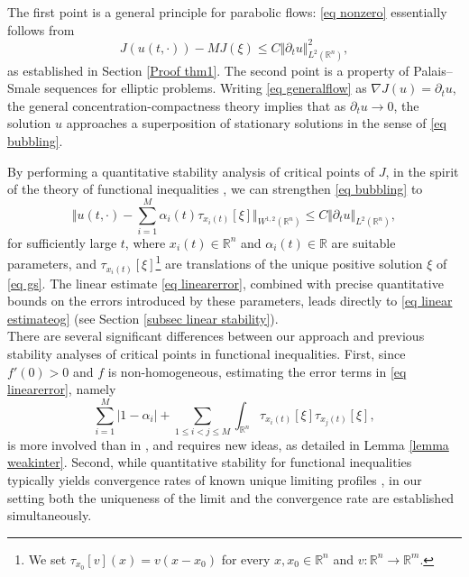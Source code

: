 \documentclass[11pt,letterpaper,reqno]{amsart}
\newcommand{\R}{\mathbb{R}}
\theoremstyle{plain}%
\theoremstyle{definition}
\numberwithin{equation}{section}
\numberwithin{figure}{section}
\begin{document}
The first point is a general principle for parabolic flows: \eqref{eq nonzero} essentially follows from
\begin{equation}\label{eq linear estimateog} 
   J(u(t,\cdot)) - M J(\xi) \le C \Vert \partial_t u \Vert^2_{L^2(\R^n)},
\end{equation}
as established in Section \ref{Proof thm1}. The second point is a property of Palais--Smale sequences for elliptic problems. Writing \eqref{eq generalflow} as $\nabla J(u) = \partial_t u$, the general concentration-compactness theory implies that as $\partial_t u \to 0$, the solution $u$ approaches a superposition of stationary solutions in the sense of \eqref{eq bubbling}.  

By performing a quantitative stability analysis of critical points of $J$, in the spirit of the theory of functional inequalities \cite{figalli2020sharp, aryan2023stability, deng2025sharp}, we can strengthen \eqref{eq bubbling} to
\begin{equation}\label{eq linearerror}
    \Big\Vert u(t,\cdot) - \sum_{i=1}^M \alpha_i(t) \tau_{x_i(t)}[\xi] \Big\Vert_{W^{1,2}(\R^n)} \le C \Vert \partial_t u \Vert_{L^2(\R^n)},
\end{equation}
for sufficiently large $t$, where $x_i(t) \in \R^n$ and $\alpha_i(t) \in \R$ are suitable parameters, and $\tau_{x_i(t)}[\xi]$\footnote{We set $\tau_{x_0}[v](x)=v(x-x_0)$ for every $x,x_0\in\R^n$ and $v:\R^n\to\R^m$.} are translations of the unique positive solution $\xi$ of \eqref{eq gs}. The linear estimate \eqref{eq linearerror}, combined with precise quantitative bounds on the errors introduced by these parameters, leads directly to \eqref{eq linear estimateog} (see Section \ref{subsec linear stability}).\\

There are several significant differences between our approach and previous stability analyses of critical points in functional inequalities. First, since $f'(0) > 0$ and $f$ is non-homogeneous, estimating the error terms in \eqref{eq linearerror}, namely
\begin{equation}\label{eq error par}
    \sum_{i=1}^M |1-\alpha_i| + \sum_{1 \le i < j \le M} \int_{\R^n} \tau_{x_i(t)}[\xi] \tau_{x_j(t)}[\xi],
\end{equation} 
is more involved than in \cite{figalli2020sharp, aryan2023stability, deng2025sharp}, and requires new ideas, as detailed in Lemma \ref{lemma weakinter}. Second, while quantitative stability for functional inequalities typically yields convergence rates of known unique limiting profiles \cite{ciraolo2018quantitative, figalli2020sharp, de2023stability, bonforte2025stability}, in our setting both the uniqueness of the limit and the convergence rate are established simultaneously.  
\end{document}
